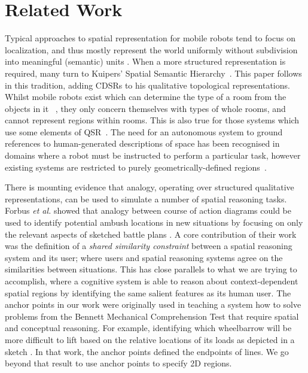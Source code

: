\documentclass[letterpaper]{article}
\begin{document}
\section{Related Work}


Typical approaches to spatial representation for mobile robots tend to focus on localization, and thus mostly represent the world uniformly without subdivision into meaningful (semantic) units \cite{Thrun02a}. When a more structured representation is required, many turn to Kuipers' Spatial Semantic Hierarchy~\cite{Kuipers:2000}. This paper follows in this tradition, adding CDSRs to his qualitative topological representations. Whilst mobile robots exist which can determine the type of a room from the objects in it ~\cite{Hanheide/etal:2010a,Galindo/etal:2005a}, they only concern themselves with types of whole rooms, and cannot represent regions within rooms. This is also true for those systems which use some elements of QSR~\cite{aydemir2011icra}. The need for an autonomous system to ground references to human-generated descriptions of space has been recognised in domains where a robot must be instructed to perform a particular task, however existing systems are restricted to purely geometrically-defined regions~\cite{Tellex:2011,Dzifcak/etal:2009,brenneretal07ijcai}.


There is mounting evidence that analogy, operating over structured qualitative representations, can be used to simulate a number of spatial reasoning tasks. Forbus \textit{et al.} showed that analogy between course of action diagrams could be used to identify potential ambush locations in new situations by focusing on only the relevant aspects of sketched battle plans \cite{Forbus/etal2003}. A core contribution of their work was the definition of a \textit{shared similarity constraint} between a spatial reasoning system and its user; where users and spatial reasoning systems agree on the similarities between situations. This has close parallels to what we are trying to accomplish, where a cognitive system is able to reason about context-dependent spatial regions by identifying the same salient features as its human user. The anchor points in our work were originally used in teaching a system how to solve problems from the Bennett Mechanical Comprehension Test that require spatial and conceptual reasoning. For example, identifying which wheelbarrow will be more difficult to lift based on the relative locations of its loads as depicted in a sketch \cite{Klenk/etal2005}. In that work, the anchor points defined the endpoints of lines. We go beyond that result to use anchor points to specify 2D regions.  
\end{document}
